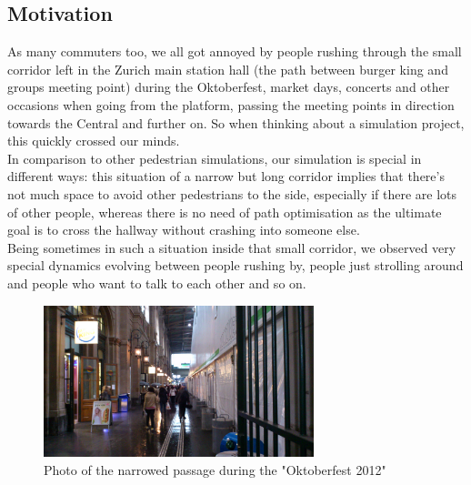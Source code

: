 

\subsection{Motivation}
As many commuters too, we all got annoyed by people rushing through the small corridor left in the Zurich main station hall (the path between burger king and groups meeting point) during the Oktoberfest, market days, concerts and other occasions when going from the platform, passing the meeting points in direction towards the Central and further on. So when thinking about a simulation project, this quickly crossed our minds.\\
In comparison to other pedestrian simulations, our simulation is special in different ways: this situation of a narrow but long corridor implies that there's not much space to avoid other pedestrians to the side, especially if there are lots of other people, whereas there is no need of path optimisation as the ultimate goal is to cross the hallway without crashing into someone else.\\
Being sometimes in such a situation inside that small corridor, we observed very special dynamics evolving between people rushing by, people just strolling around and people who want to talk to each other and so on.

\begin{figure}[h!]
	\centering
		\includegraphics[width=0.70\textwidth]{pictures/oktoberfest2}
	\caption{Photo of the narrowed passage during the "Oktoberfest 2012"}
	\label{fig:oktoberfest2}
\end{figure}

